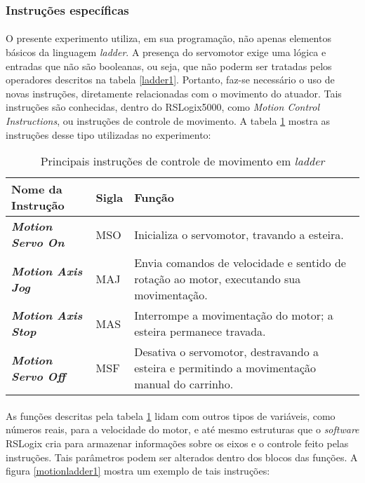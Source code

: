 \subsubsection{Instruções específicas}
\paragraph{}O presente experimento utiliza, em sua programação, não apenas elementos básicos da linguagem \textit{ladder}. A presença do servomotor exige uma lógica e entradas que não são booleanas, ou seja, que não poderm ser tratadas pelos operadores descritos na tabela \ref{ladder1}. Portanto, faz-se necessário o uso de novas instruções, diretamente relacionadas com o movimento do atuador. Tais instruções são conhecidas, dentro do RSLogix5000, como \textit{Motion Control Instructions}, ou instruções de controle de movimento. A tabela \ref{ladder2} mostra as instruções desse tipo utilizadas no experimento:

\begin{table}[!ht]
  \centering
  \caption{Principais instruções de controle de movimento em \textit{ladder} \label{ladder2}}
  \begin{tabularx}{\textwidth}{|>{\bfseries}l|l|X|}
    \hline
    Nome da Instrução & Sigla & Função \\ \hline
    \textit{Motion Servo On} & MSO & Inicializa o servomotor, travando a esteira. \\ \hline
    \textit{Motion Axis Jog} & MAJ & Envia comandos de velocidade e sentido de rotação ao motor, executando sua movimentação. \\ \hline
    \textit{Motion Axis Stop} & MAS & Interrompe a movimentação do motor; a esteira permanece travada. \\ \hline
    \textit{Motion Servo Off} & MSF & 
    Desativa o servomotor, destravando a esteira e permitindo a movimentação manual do carrinho.\\ \hline
  \end{tabularx}
\end{table}

\paragraph{}As funções descritas pela tabela \ref{ladder2} lidam com outros tipos de variáveis, como números reais, para a velocidade do motor, e até mesmo estruturas que o \textit{software} RSLogix cria para armazenar informações sobre os eixos e o controle feito pelas instruções. Tais parâmetros podem ser alterados dentro dos blocos das funções. A figura \ref{motionladder1} mostra um exemplo de tais instruções:


